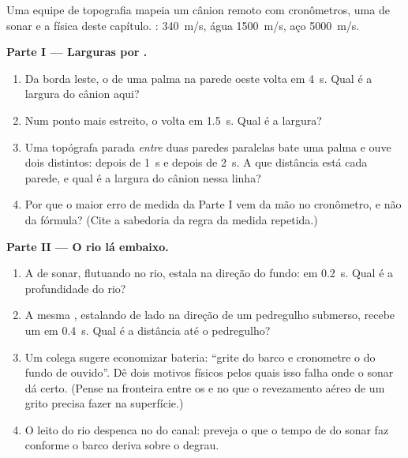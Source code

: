 \begin{problem}\label{pb:g7:sound-production:1}
Uma equipe de topografia mapeia um cânion remoto com cronômetros, uma
 de sonar e a física deste capítulo. : 
\qty{340}{m/s}, água \qty{1500}{m/s}, aço \qty{5000}{m/s}.

\medskip\noindent\textbf{Parte I --- Larguras por .}
\begin{enumerate}
  \item Da borda leste, o  de uma palma na parede oeste volta em
        \qty{4}{s}. Qual é a largura do cânion aqui?
  \item Num ponto mais estreito, o  volta em \qty{1.5}{s}. Qual é
        a largura?
  \item Uma topógrafa parada \emph{entre} duas paredes paralelas bate
        uma palma e ouve dois  distintos: depois de \qty{1}{s} e
        depois de \qty{2}{s}. A que distância está cada parede, e
        qual é a largura do cânion nessa linha?
  \item Por que o maior erro de medida da Parte I vem da mão no
        cronômetro, e não da fórmula? (Cite a sabedoria da regra da
        medida repetida.)
\end{enumerate}

\medskip\noindent\textbf{Parte II --- O rio lá embaixo.}
\begin{enumerate}[resume]
  \item A  de sonar, flutuando no rio, estala na direção do
        fundo:  em \qty{0.2}{s}. Qual é a profundidade do rio?
  \item A mesma , estalando de lado na direção de um
        pedregulho submerso, recebe um  em \qty{0.4}{s}. Qual é a
        distância até o pedregulho?
  \item Um colega sugere economizar bateria: ``grite do barco e
        cronometre o  do fundo de ouvido''. Dê dois motivos
        físicos pelos quais isso falha onde o sonar dá certo. (Pense
        na fronteira entre os  e no que o revezamento aéreo de
        um grito precisa fazer na superfície.)
  \item O leito do rio despenca no  do canal: preveja o que o
        tempo de  do sonar faz conforme o barco deriva sobre o
        degrau.
\end{enumerate}


\end{problem}
